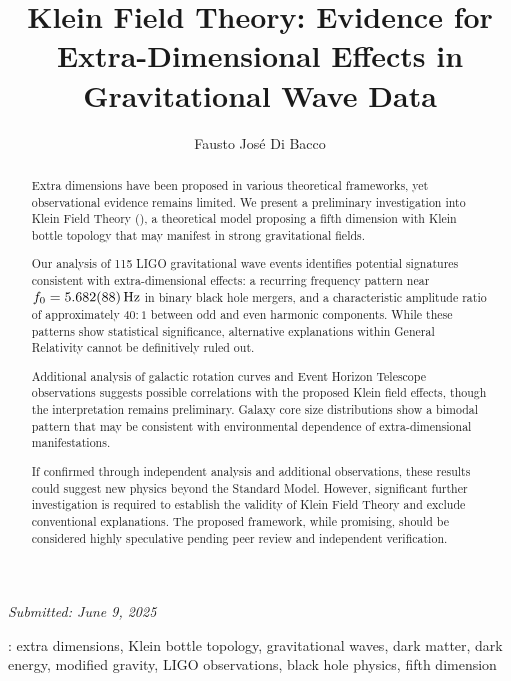 \documentclass[12pt]{iopart}
\newcommand{\KFT}{\text{KFT}}
\newcommand{\fzero}{f_0}
\begin{document}
\title[Klein Field Theory]{Klein Field Theory: Evidence for Extra-Dimensional Effects in Gravitational Wave Data}

\author{Fausto Jos\'e Di Bacco}

\address{Independent Researcher, Tucum\'an, Argentina}

\vspace{0.5cm}
\begin{center}
\textit{Submitted: June 9, 2025}
\end{center}
\vspace{0.3cm}

\begin{abstract}
Extra dimensions have been proposed in various theoretical frameworks, yet observational evidence remains limited. We present a preliminary investigation into Klein Field Theory (\KFT), a theoretical model proposing a fifth dimension with Klein bottle topology that may manifest in strong gravitational fields.

Our analysis of 115 LIGO gravitational wave events identifies potential signatures consistent with extra-dimensional effects: a recurring frequency pattern near $\fzero = \SI{5.682 \pm 0.088}{\hertz}$ in binary black hole mergers, and a characteristic amplitude ratio of approximately $40:1$ between odd and even harmonic components. While these patterns show statistical significance, alternative explanations within General Relativity cannot be definitively ruled out.

Additional analysis of galactic rotation curves and Event Horizon Telescope observations suggests possible correlations with the proposed Klein field effects, though the interpretation remains preliminary. Galaxy core size distributions show a bimodal pattern that may be consistent with environmental dependence of extra-dimensional manifestations.

If confirmed through independent analysis and additional observations, these results could suggest new physics beyond the Standard Model. However, significant further investigation is required to establish the validity of Klein Field Theory and exclude conventional explanations. The proposed framework, while promising, should be considered highly speculative pending peer review and independent verification.
\end{abstract}

: extra dimensions, Klein bottle topology, gravitational waves, dark matter, dark energy, modified gravity, LIGO observations, black hole physics, fifth dimension
\end{document}
